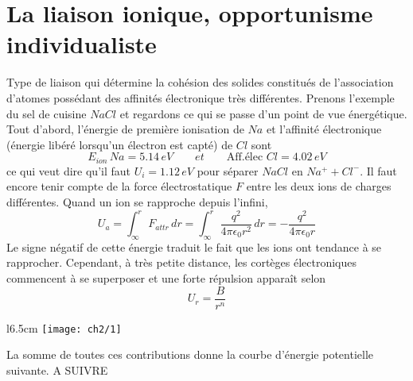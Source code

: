\section{La liaison ionique, opportunisme individualiste}
	Type de liaison qui détermine la cohésion des solides constitués de l'association d'atomes possédant des affinités électronique très différentes. Prenons l'exemple du sel de cuisine $NaCl$ et regardons ce qui se passe d'un point de vue énergétique. Tout d'abord, l'énergie de première ionisation de $Na$ et l'affinité électronique (énergie libéré lorsqu'un électron est capté) de $Cl$ sont
	\begin{equation}
		E_{ion}\, Na= 5.14 \, eV \qquad et \qquad \mbox{Aff.élec } Cl = 4.02 \, eV 
	\end{equation}	 
	ce qui veut dire qu'il faut $U_i = 1.12\, eV$ pour séparer $NaCl$ en $Na^++Cl^-$. Il faut encore tenir compte de la force électrostatique $F$ entre les deux ions de charges différentes. Quand un ion se rapproche depuis l'infini, 
	\begin{equation}
		U_a = \int _\infty ^r F_{attr} \, dr= \int _\infty ^r \frac{q^2}{4\pi \epsilon _0 r^2} \, dr = -\frac{q^2}{4\pi \epsilon _0 r}
	\end{equation}
	Le signe négatif de cette énergie traduit le fait que les ions ont tendance à se rapprocher. Cependant, à très petite distance, les cortèges électroniques commencent à se superposer et une forte répulsion apparaît selon 
	\begin{equation}
		U_r = \frac{B}{r^n}
	\end{equation}
	\begin{wrapfigure}[5]{l}{6.5cm}
	\vspace{-5mm}
	\texttt{[image: ch2/1]}
	\end{wrapfigure}
	La somme de toutes ces contributions donne la courbe d'énergie potentielle suivante. 
	A SUIVRE